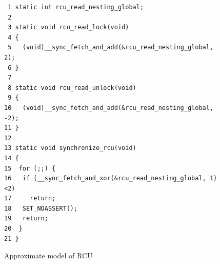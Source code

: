 \documentclass{svjour3}
\begin{document}

\begin{figure}[tb]
{ %
\begin{verbatim}
 1 static int rcu_read_nesting_global;
 2 
 3 static void rcu_read_lock(void)
 4 {
 5   (void)__sync_fetch_and_add(&rcu_read_nesting_global, 2);
 6 }
 7 
 8 static void rcu_read_unlock(void)
 9 {
10   (void)__sync_fetch_and_add(&rcu_read_nesting_global, -2);
11 }
12 
13 static void synchronize_rcu(void)
14 {
15  for (;;) {
16   if (__sync_fetch_and_xor(&rcu_read_nesting_global, 1)<2)
17     return;
18   SET_NOASSERT();
19   return;
20  }
21 }
\end{verbatim}
}
\caption{Approximate model of RCU}
\label{fig:Approximate Model of RCU}
\end{figure}
\end{document}
